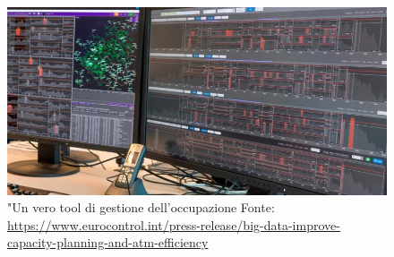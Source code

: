    \begin{figure}[H]
     \centering
     \includegraphics[width=1\textwidth]{figures/big-data-improve-capacity-planning-and-atm-efficiency_1.jpg}
     \caption{"Un vero tool di gestione dell'occupazione Fonte: \url{https://www.eurocontrol.int/press-release/big-data-improve-capacity-planning-and-atm-efficiency}}
   \end{figure}